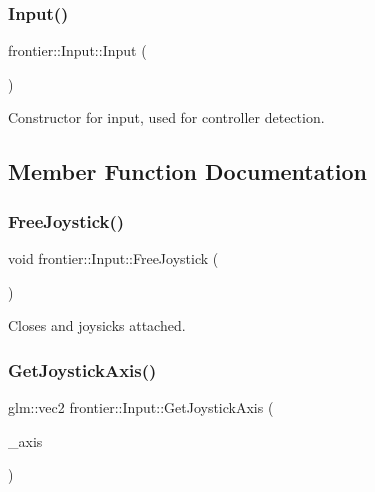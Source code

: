 \subsubsection{\texorpdfstring{Input()}{Input()}}
{\footnotesize\ttfamily frontier\+::\+Input\+::\+Input (\begin{DoxyParamCaption}{ }\end{DoxyParamCaption})}



Constructor for input, used for controller detection. 



\subsection{Member Function Documentation}
\mbox{\label{classfrontier_1_1_input_a93acada680176426a09bd5cc4606fe6c}} 
\subsubsection{\texorpdfstring{Free\+Joystick()}{FreeJoystick()}}
{\footnotesize\ttfamily void frontier\+::\+Input\+::\+Free\+Joystick (\begin{DoxyParamCaption}{ }\end{DoxyParamCaption})}



Closes and joysicks attached. 

\mbox{\label{classfrontier_1_1_input_a60c4086a12484369d9e96c065b5cce52}} 
\subsubsection{\texorpdfstring{Get\+Joystick\+Axis()}{GetJoystickAxis()}}
{\footnotesize\ttfamily glm\+::vec2 frontier\+::\+Input\+::\+Get\+Joystick\+Axis (\begin{DoxyParamCaption}\item[{\hyperlink{classfrontier_1_1_input_aa34e103eba0f13faf437863692310859}{Controller\+Axes}}]{\+\_\+axis }\end{DoxyParamCaption})}



